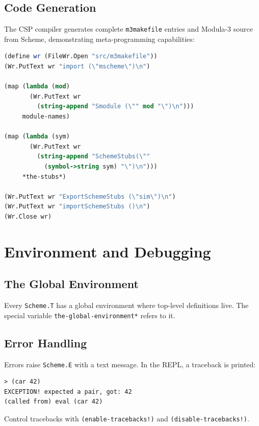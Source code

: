 \documentclass[12pt]{report}
\begin{document}
\section{Code Generation}

The CSP compiler generates complete {\tt m3makefile} entries and
Modula-3 source from Scheme, demonstrating meta-programming capabilities:

\begin{lstlisting}[language=Scheme]
(define wr (FileWr.Open "src/m3makefile"))
(Wr.PutText wr "import (\"mscheme\")\n")

(map (lambda (mod)
       (Wr.PutText wr
         (string-append "Smodule (\"" mod "\")\n")))
     module-names)

(map (lambda (sym)
       (Wr.PutText wr
         (string-append "SchemeStubs(\""
           (symbol->string sym) "\")\n")))
     *the-stubs*)

(Wr.PutText wr "ExportSchemeStubs (\"sim\")\n")
(Wr.PutText wr "importSchemeStubs ()\n")
(Wr.Close wr)
\end{lstlisting}


\chapter{Environment and Debugging}

\section{The Global Environment}

Every {\tt Scheme.T} has a global environment where top-level
definitions live.  The special variable {\tt *the-global-environment*}
refers to it.

\section{Error Handling}

Errors raise {\tt Scheme.E} with a text message.  In the REPL, a
traceback is printed:

\begin{lstlisting}[language={}]
> (car 42)
EXCEPTION! expected a pair, got: 42
(called from) eval (car 42)
\end{lstlisting}

Control tracebacks with {\tt (enable-tracebacks!)} and
{\tt (disable-tracebacks!)}.
\end{document}
